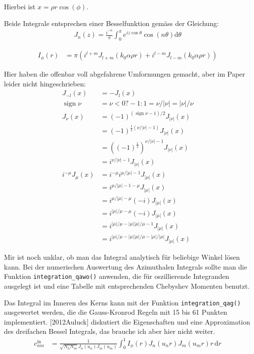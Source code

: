 \documentclass[DIV19,twocolumn]{scrartcl}
\def\({\left(}
\def\){\right)}
\DeclareMathOperator{\sign}{sign}
\begin{document}
Hierbei ist $x=\rho r \cos(\phi)$.

Beide Integrale entsprechen einer Besselfunktion gem\"ass der
Gleichung:
\begin{align}
  J_n(z) = \frac{i^{-n}}{\pi}\int_0^\pi e^{iz\cos\theta} \cos(n \theta) \textrm{d} \theta
\end{align}

\begin{align}
  I_\phi(r) &= \pi \(i^{l+m} J_{l+m}(k_0\alpha\rho r)+i^{l-m} J_{l-m}(k_0\alpha\rho r)\)
\end{align}

Hier haben die offenbar voll abgefahrene Umformungen gemacht, aber im
Paper leider nicht hingeschrieben:
\begin{align}
J_{-l}(x) &= -J_l(x) \\
\sign \nu &= \nu<0 ? -1 : 1 = \nu/|\nu| = |\nu|/\nu \\
J_\nu(x) &= (-1)^{(\sign{\nu}-1)/2} J_{|\nu|}(x) \\ 
& = (-1)^{\frac{1}{2}(\nu/|\nu|-1)} J_{|\nu|}(x) \\ 
& = ((-1)^{\frac{1}{2}})^{\nu/|\nu|-1} J_{|\nu|}(x) \\ 
& = i^{\nu/|\nu|-1} J_{|\nu|}(x)\\
i^{-\mu} J_\mu(x) &= i^{-\mu} i^{\mu/|\mu|-1} J_{|\mu|}(x)\\
&= i^{\mu/|\mu|-1 -\mu } J_{|\mu|}(x) \\
&= i^{\mu/|\mu| -\mu } (-i) J_{|\mu|}(x) \\
&= i^{|\mu|/\mu-\mu} (-i) J_{|\mu|}(x) \\
&= i^{|\mu|/\mu-|\mu| |\mu| /\mu-1} J_{|\mu|}(x) \\
&= i^{|\mu|/\mu-|\mu| |\mu| /\mu-|\mu|/|\mu|} J_{|\mu|}(x)
\end{align}


Mir ist noch unklar, ob man das Integral analytisch f\"ur beliebige
Winkel l\"osen kann.  Bei der numerischen Auswertung des Azimuthalen
Integrals sollte man die Funktion \verb!integration_qawo()! anwenden,
die f\"ur oszillierende Integranden ausgelegt ist und eine Tabelle mit
entsprechenden Chebyshev Momenten benutzt.

Das Integral im Inneren des Kerns kann mit der Funktion
\verb!integration_qag()! ausgewertet werden, die die Gauss-Kronrod
Regeln mit 15 bis 61 Punkten implementiert.  [2012Auluck] diskutiert
die Eigenschaften und eine Approximation des dreifachen Bessel
Integrals, das brauche ich aber hier nicht weiter.
\begin{align}
    c_{nm}^\textrm{in}&=\frac{1}{\sqrt{N_n N_m} J_n(u_n) J_m(u_m)}
    \int_0^1\!\!\!\! I_\phi(r) J_n(u_n r) J_m(u_m r) r\, \textrm{d}r 
\end{align}
\end{document}
